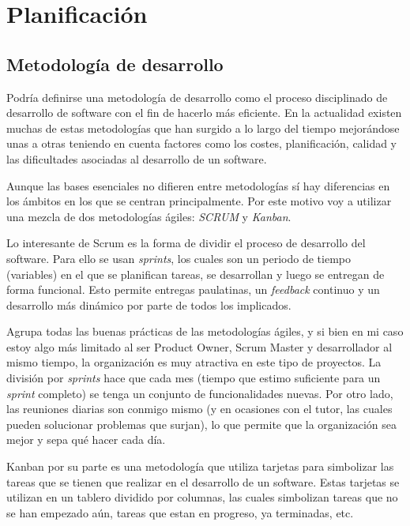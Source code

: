 \chapter{Planificación}

\section{Metodología de desarrollo}

Podría definirse una metodología de desarrollo como el proceso disciplinado de desarrollo de software con el fin de hacerlo más eficiente. En la actualidad existen muchas de estas metodologías que han surgido a lo largo del tiempo mejorándose unas a otras teniendo en cuenta factores como los costes, planificación, calidad y las dificultades asociadas al desarrollo de un software.

Aunque las bases esenciales no difieren entre metodologías sí hay diferencias en los ámbitos en los que se centran principalmente. Por este motivo voy a utilizar una mezcla de dos metodologías ágiles: \textit{SCRUM} y \textit{Kanban}.

Lo interesante de Scrum es la forma de dividir el proceso de desarrollo del software. Para ello se usan \textit{sprints}, los cuales son un periodo de tiempo (variables) en el que se planifican tareas, se desarrollan y luego se entregan de forma funcional. Esto permite entregas paulatinas, un \textit{feedback} continuo y un desarrollo más dinámico por parte de todos los implicados.

Agrupa todas las buenas prácticas de las metodologías ágiles, y si bien en mi caso estoy algo más limitado al ser Product Owner, Scrum Master y desarrollador al mismo tiempo, la organización es muy atractiva en este tipo de proyectos. La división por \textit{sprints} hace que cada mes (tiempo que estimo suficiente para un \textit{sprint} completo) se tenga un conjunto de funcionalidades nuevas. Por otro lado, las reuniones diarias son conmigo mismo (y en ocasiones con el tutor, las cuales pueden solucionar problemas que surjan), lo que permite que la organización sea mejor y sepa qué hacer cada día.

\bigskip
Kanban por su parte es una metodología que utiliza tarjetas para simbolizar las tareas que se tienen que realizar en el desarrollo de un software. Estas tarjetas se utilizan en un tablero dividido por columnas, las cuales simbolizan tareas que no se han empezado aún, tareas que estan en progreso, ya terminadas, etc.

